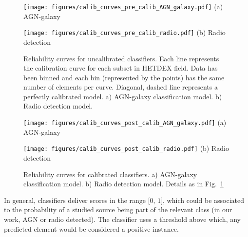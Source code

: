 \documentclass{aa}
\begin{document}
\begin{appendix}
\begin{figure}
  \centering
  \begin{minipage}{0.24\textwidth}
    \centering
    \texttt{[image: figures/calib\_curves\_pre\_calib\_AGN\_galaxy.pdf]}\hfill\break%
    {(a) AGN-galaxy}
  \end{minipage}
  \hfill 
  \begin{minipage}{0.24\textwidth}
    \centering
    \texttt{[image: figures/calib\_curves\_pre\_calib\_radio.pdf]}\hfill\break%
    {(b) Radio detection}
  \end{minipage}
  \caption{Reliability curves for uncalibrated classifiers. Each line represents the calibration curve for each subset in HETDEX field. Data has been binned and each bin (represented by the points) has the same number of elements per curve. Diagonal, dashed line represents a perfectly calibrated model. a) AGN-galaxy classification model. b) Radio detection model.}
  \label{fig:calibration_curves_classification_pre}
\end{figure}

\begin{figure}
  \centering
  \begin{minipage}{0.24\textwidth}
    \centering
    \texttt{[image: figures/calib\_curves\_post\_calib\_AGN\_galaxy.pdf]}\hfill\break%
    {(a) AGN-galaxy}
  \end{minipage}
  \hfill 
  \begin{minipage}{0.24\textwidth}
    \centering
    \texttt{[image: figures/calib\_curves\_post\_calib\_radio.pdf]}\hfill\break%
    {(b) Radio detection}
  \end{minipage}
  \caption{Reliability curves for calibrated classifiers. a) AGN-galaxy classification model. b) Radio detection model. Details as in Fig.~\ref{fig:calibration_curves_classification_pre}}
  \label{fig:calibration_curves_classification_post}
\end{figure}

In general, classifiers deliver scores in the range [$0$, $1$], which could be associated to the probability of a studied source being part of the relevant class (in our work, AGN or radio detected). The classifier uses a threshold above which, any predicted element would be considered a positive instance. 


\end{appendix}
\end{document}
